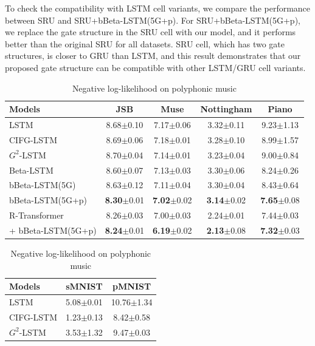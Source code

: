 \documentclass[letterpaper]{article} %
\begin{document}
%
To check the compatibility with LSTM cell variants, we compare the performance between SRU and SRU+bBeta-LSTM(5G+p). For SRU+bBeta-LSTM(5G+p), we replace the gate structure in the SRU cell with our model, and it performs better than the original SRU for all datasets. SRU cell, which has two gate structures, is closer to GRU than LSTM, and this result demonstrates that our proposed gate structure can be compatible with other LSTM/GRU cell variants.
%
\begin{table}[h!]
	\small
	\begin{minipage}{.61\linewidth}
		\centering
		\begin{tabular}{lcccc}
			\toprule
			Models & JSB & Muse & Nottingham & Piano \\
			\midrule
			LSTM & 8.68$\pm$0.10 & 7.17$\pm$0.06 &3.32$\pm$0.11 & 9.23$\pm$1.13 \\
			CIFG-LSTM & 8.69$\pm$0.06 & 7.18$\pm$0.01 &3.28$\pm$0.10 & 8.99$\pm$1.57 \\
			$G^{2}$-LSTM & 8.70$\pm$0.04 & 7.14$\pm$0.01 &3.23$\pm$0.04 & 9.00$\pm$0.84 \\
			\midrule
			Beta-LSTM   & 8.60$\pm$0.07 & 7.13$\pm$0.03& 3.30$\pm$0.06 & 8.24$\pm$0.26\\
			bBeta-LSTM(5G) & 8.63$\pm$0.12 & 7.11$\pm$0.04 & 3.30$\pm$0.04 & 8.43$\pm$0.64\\
			bBeta-LSTM(5G+p) & \textbf{8.30}$\pm$0.01 & \textbf{7.02}$\pm$0.02 & \textbf{3.14}$\pm$0.02 & \textbf{7.65}$\pm$0.08 \\
			\midrule
			R-Transformer   & 8.26$\pm$0.03 & 7.00$\pm$0.03& 2.24$\pm$0.01 & 7.44$\pm$0.03\\
			\hspace{1pt} + bBeta-LSTM(5G+p) & \textbf{8.24}$\pm$0.01 & \textbf{6.19}$\pm$0.02 & \textbf{2.13}$\pm$0.08 & \textbf{7.32}$\pm$0.03\\
			\bottomrule
		\end{tabular}
		\caption{Negative log-likelihood on polyphonic music}
		\label{table:music}
	\end{minipage}%
	\begin{minipage}{.35\linewidth}
		\centering
		\begin{tabular}{lcc}
			\toprule
			Models & sMNIST & pMNIST \\
			\midrule
			LSTM    & 5.08$\pm$0.01 & 10.76$\pm$1.34 \\
			CIFG-LSTM & 1.23$\pm$0.13 & 8.42$\pm$0.58\\
			$G^{2}$-LSTM & 3.53$\pm$1.32 & 9.47$\pm$0.03\\

\end{tabular}
\end{minipage}
\end{table}
\end{document}
